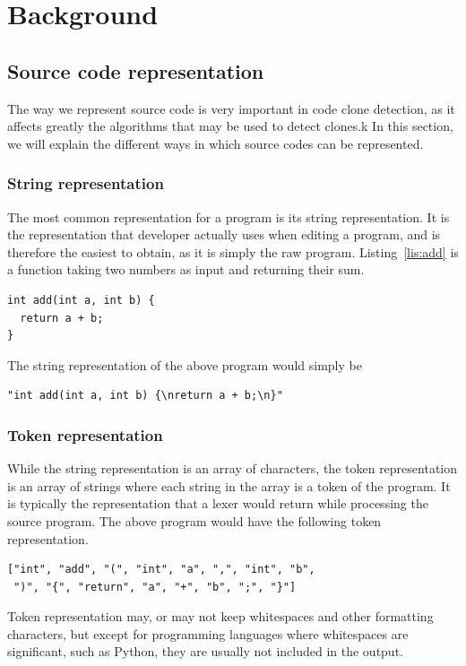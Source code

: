 \chapter{Background}
\section{\label{sec:code-representation} Source code representation}
The way we represent source code is very important in code clone detection,
as it affects greatly the algorithms that may be used to detect clones.k
In this section, we will explain the different ways in which source codes
can be represented.
\subsection{\label{ssec:string-representation} String representation}
The most common representation for a program is its string representation. It is
the representation that developer actually uses when editing a program, and
is therefore the easiest to obtain, as it is simply the raw program.
Listing~\ref{lis:add} is a function taking two numbers as input and returning
their sum.
\begin{lstlisting}[caption=\lstinline{add} function,label=lis:add]
int add(int a, int b) {
  return a + b;
}
\end{lstlisting}
The string representation of the above program would simply be
\begin{lstlisting}
"int add(int a, int b) {\nreturn a + b;\n}"
\end{lstlisting}
\subsection{\label{ssec:token-representation}Token representation}
While the string representation is an array of characters, the token
representation is an array of strings where each string in the array is a token
of the program. It is typically the representation that a lexer would return
while processing the source program. The above program would have the following
token representation.
\begin{lstlisting}
["int", "add", "(", "int", "a", ",", "int", "b",
 ")", "{", "return", "a", "+", "b", ";", "}"]
\end{lstlisting}
Token representation may, or may not keep whitespaces and other formatting
characters, but except for programming languages where whitespaces are significant,
such as Python, they are usually not included in the output.
